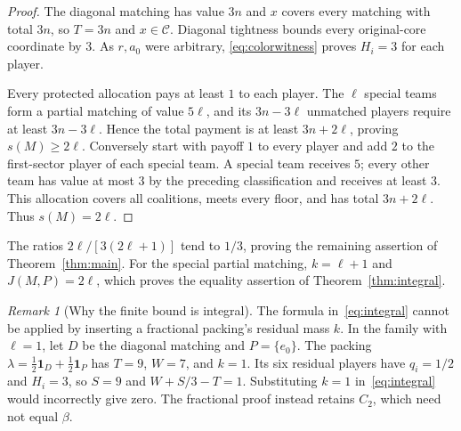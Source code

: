 \documentclass[11pt]{article}
\theoremstyle{remark}
\newtheorem{remark}[theorem]{Remark}
\newcommand{\core}{\mathcal C}
\newcommand{\one}{\mathbf 1}
\begin{document}
\begin{proof}
The diagonal matching has value $3n$ and $x$ covers every matching with
total $3n$, so $T=3n$ and $x\in\core$. Diagonal tightness bounds every
original-core coordinate by $3$. As $r,a_0$ were arbitrary,
\eqref{eq:colorwitness} proves $H_i=3$ for each player.

Every protected allocation pays at least $1$ to each player. The $\ell$
special teams form a partial matching of value $5\ell$, and its
$3n-3\ell$ unmatched players require at least $3n-3\ell$. Hence the
total payment is at least $3n+2\ell$, proving $s(M)\ge2\ell$.
Conversely start with payoff $1$ to every player and add $2$ to the
first-sector player of each special team. A special team receives $5$;
every other team has value at most $3$ by the preceding classification
and receives at least $3$. This allocation covers all coalitions, meets
every floor, and has total $3n+2\ell$. Thus $s(M)=2\ell$.
\end{proof}

The ratios $2\ell/[3(2\ell+1)]$ tend to $1/3$, proving the remaining
assertion of Theorem~\ref{thm:main}. For the special partial matching,
$k=\ell+1$ and $J(M,P)=2\ell$, which proves the equality assertion
of Theorem~\ref{thm:integral}.

\begin{remark}[Why the finite bound is integral]\label{rem:fractional}
The formula in~\eqref{eq:integral} cannot be applied by inserting a
fractional packing's residual mass $k$. In the family with $\ell=1$,
let $D$ be the diagonal matching and $P=\{e_0\}$. The packing
$\lambda=\tfrac12\one_D+\tfrac12\one_P$ has $T=9$, $W=7$, and
$k=1$. Its six residual players have $q_i=1/2$ and $H_i=3$, so $S=9$
and $W+S/3-T=1$. Substituting $k=1$ in~\eqref{eq:integral} would
incorrectly give zero. The fractional proof instead retains $C_2$,
which need not equal $\beta$.
\end{remark}
\end{document}
